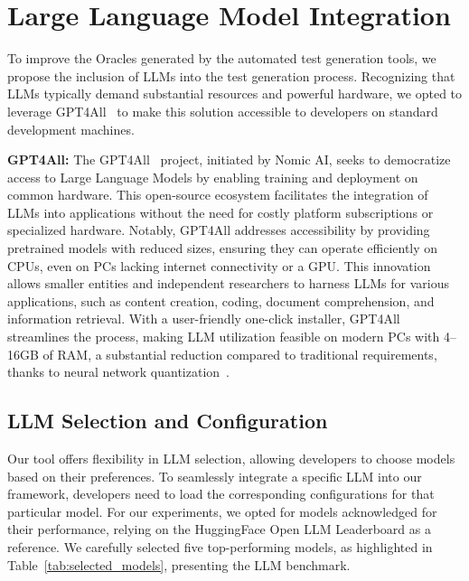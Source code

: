 \section{Large Language Model Integration}
\label{sec:llm_integration}
\vspace{0.2 cm}

To improve the Oracles generated by the automated test generation tools, we propose the inclusion of LLMs into the test generation process. Recognizing that LLMs typically demand substantial resources and powerful hardware, we opted to leverage GPT4All~\cite{noauthor_gpt4all_nodate} to make this solution accessible to developers on standard development machines.

\textbf{GPT4All:} The GPT4All~\cite{noauthor_gpt4all_nodate} project, initiated by Nomic AI, seeks to democratize access to Large Language Models by enabling training and deployment on common hardware. This open-source ecosystem facilitates the integration of LLMs into applications without the need for costly platform subscriptions or specialized hardware. Notably, GPT4All addresses accessibility by providing pretrained models with reduced sizes, ensuring they can operate efficiently on CPUs, even on PCs lacking internet connectivity or a GPU. This innovation allows smaller entities and independent researchers to harness LLMs for various applications, such as content creation, coding, document comprehension, and information retrieval. With a user-friendly one-click installer, GPT4All streamlines the process, making LLM utilization feasible on modern PCs with 4–16GB of RAM, a substantial reduction compared to traditional requirements, thanks to neural network quantization~\cite{han_deep_2016}.

\vspace{0.1 cm}
\subsection{LLM Selection and Configuration}
\label{sec:llm_configurations}
\vspace{0.1 cm}

Our tool offers flexibility in LLM selection, allowing developers to choose models based on their preferences. To seamlessly integrate a specific LLM into our framework, developers need to load the corresponding configurations for that particular model. For our experiments, we opted for models acknowledged for their performance, relying on the HuggingFace\cite{noauthor_hugging_2023} Open LLM Leaderboard\cite{open-llm-leaderboard} as a reference. We carefully selected five top-performing models, as highlighted in Table~\ref{tab:selected_models}, presenting the LLM benchmark.

